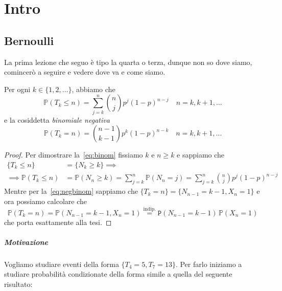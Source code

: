 \chapter{Intro}

\section{Bernoulli}

La prima lezione che seguo è tipo la quarta o terza, dunque non so dove siamo,
comincerò a seguire e vedere dove va e come siamo.

\begin{theorem}{}
    Per ogni \(k \in \{1, 2, \dots \} \), abbiamo che
    \begin{equation}\label{eq:binom}
        \mathbb{P}{(T_k \le n)} = \sum_{j=k}^{n} \binom{n}{j} p^{j}
        {(1-p)}^{n-j} \quad n = k, k+1, \dots
    \end{equation}
    e la cosiddetta \emph{binomiale negativa}
    \begin{equation}\label{eq:negbinom}
        \mathbb{P}{(T_k = n)} = \binom{n-1}{k-1} p^{k} {(1-p)}^{n-k} \quad n =
        k, k+1, \dots
    \end{equation}
\end{theorem}
\begin{proof}{}
    Per dimostrare la~\eqref{eq:binom} fissiamo \(k\) e \(n\ge k\) e sappiamo
    che
    \begin{align*}
        \{T_k \le n\} &= \{N_k \ge k\} \implies \\\implies  \mathbb{P}{(T_k \le
        n)} &= \mathbb{P}{(N_n\ge k)} = \sum_{j=k}^{n} \mathbb{P}{(N_n = j)} =
      \sum_{j=k}^{n} \binom{n}{j} p^{j} {(1-p)}^{n-j}
    \end{align*}
    Mentre per la~\eqref{eq:negbinom} sappiamo che \(\{T_k = n\}  = \{N_{n-1} =
    k-1, X_n = 1\} \) e ora possiamo calcolare che
    \[
      \mathbb{P}{(T_k = n)} = \mathbb{P}{(N_{n-1} = k-1, X_n = 1)}
      \overset{\text{indip.}}{=} \mathtt{P}{(N_{n-1} = k-1)}\, \mathbb{P}{(X_n =1)}
    \]
    che porta esattamente alla tesi.
\end{proof}

\paragraph{Motivazione}
Vogliamo studiare eventi della forma \(\{T_4 = 5, T_{7} = 13\} \). Per farlo
iniziamo a studiare probabilità condizionate della forma simile a quella del
seguente risultato:

